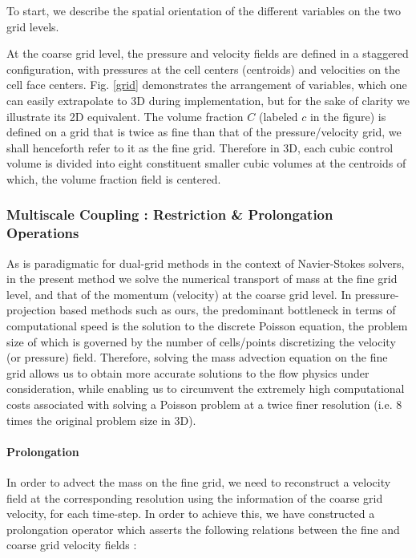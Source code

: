 To start, we describe the spatial orientation of the different 
variables on the two grid levels.   


At the coarse grid level, the pressure and velocity fields are 
defined in a staggered configuration, with pressures at the cell 
centers (centroids) and velocities on the cell face centers. 
Fig. \ref{grid} demonstrates the arrangement of variables, 
which one can easily extrapolate to 3D during implementation, 
but for the sake of clarity we illustrate its 2D equivalent. 
The volume fraction $C$ (labeled $c$ in the figure) is defined on 
a grid that is twice as fine than that of the pressure/velocity grid, 
we shall henceforth refer to it as the fine grid. 
Therefore in 3D, each cubic control volume is divided into eight constituent 
smaller cubic volumes at the centroids of which, the volume fraction field is centered. 



\subsubsection*{Multiscale Coupling : Restriction \& Prolongation Operations}

As is paradigmatic for dual-grid methods in the context of Navier-Stokes solvers, in the present method we solve the numerical transport of mass at the fine grid level, and that of the momentum (velocity) at the coarse grid level. In pressure-projection based methods such as ours, the predominant bottleneck in terms of computational speed is the solution to the discrete Poisson equation, the problem size of which is governed by the number of cells/points discretizing the velocity (or pressure) field. Therefore, solving the mass advection equation on the fine grid allows us to obtain more accurate solutions to the flow physics under consideration, while enabling us to circumvent the extremely high computational costs associated with solving a Poisson problem at a twice finer resolution (i.e. 8 times the original problem size in 3D).  

\paragraph{\textbf{Prolongation}}

In order to advect the mass on the fine grid, we need to reconstruct a velocity field at the corresponding resolution using the information of the coarse grid velocity, for each time-step. In order to achieve this, we have constructed a prolongation operator which asserts the following relations between the fine and coarse grid velocity fields : 

